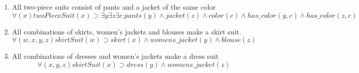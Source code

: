 \documentclass[paper=a4, fontsize=11pt]{scrartcl} %
\numberwithin{equation}{section} %
\numberwithin{figure}{section} %
\numberwithin{table}{section} %
\begin{document}
\begin{enumerate}
\item All two-piece suits consist of pants and a jacket of the same color
\begin{equation*}
	\forall(x) twoPieceSuit(x) \supset \exists y \exists z \exists c \; pants(y) \land jacket(z) \land color(c) \land has\_color(y,c) \land has\_color(z,c)
\end{equation*}


\item All combinations of skirts, women's jackets and blouses make a skirt suit.
\begin{equation*}
	\forall(w,x,y,z) skirtSuit(w) \supset skirt(x) \land womens\_jacket(y) \land blouse(z) 
\end{equation*}

\item All combinations of dresses and women's jackets make a dress suit
\begin{equation*}
	\forall(x,y,z) skirtSuit(x) \supset dress(y) \land womens\_jacket(z) 
\end{equation*}

\end{enumerate}
\end{document}
